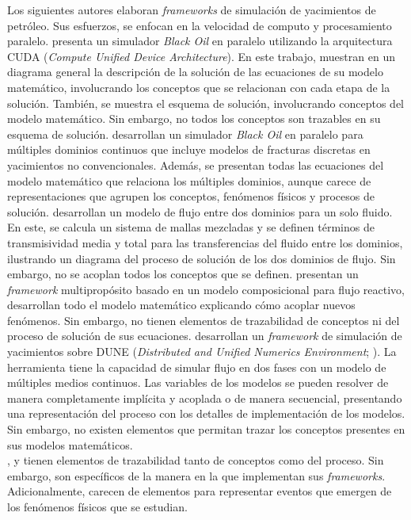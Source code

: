 Los siguientes autores elaboran \textit{frameworks} de simulación de yacimientos de petróleo. Sus esfuerzos, se enfocan en la velocidad de computo y procesamiento paralelo. \cite{Zaza2016} presenta un simulador \textit{Black Oil} en paralelo utilizando la arquitectura CUDA (\textit{Compute Unified Device Architecture}). En este trabajo, \cite{Zaza2016} muestran en un diagrama general la descripción de la solución de las ecuaciones de su modelo matemático, involucrando los conceptos que se relacionan con cada etapa de la solución. También, se muestra el esquema de solución, involucrando conceptos del modelo matemático. Sin embargo, no todos los conceptos son trazables en su esquema de solución. \cite{Wang2016, Wang2017} desarrollan un simulador \textit{Black Oil} en paralelo para múltiples dominios continuos que incluye modelos de fracturas discretas en yacimientos no convencionales. Además, se presentan todas las ecuaciones del modelo matemático que relaciona los múltiples dominios, aunque carece de representaciones que agrupen los conceptos, fenómenos físicos y procesos de solución. \cite{FANG2017} desarrollan un modelo de flujo entre dos dominios para un solo fluido. En este, se calcula un sistema de mallas mezcladas y se definen términos de transmisividad media y total para las transferencias del fluido entre los dominios, ilustrando un diagrama del proceso de solución de los dos dominios de flujo. Sin embargo, no se acoplan todos los conceptos que se definen. \cite{Qiao2017} presentan un \textit{framework} multipropósito basado en un modelo composicional para flujo reactivo, desarrollan todo el modelo matemático explicando cómo acoplar nuevos fenómenos. Sin embargo, no tienen elementos de trazabilidad de conceptos ni del proceso de solución de sus ecuaciones. \cite{Flemisch2011} desarrollan un \textit{framework} de simulación de yacimientos sobre DUNE (\textit{Distributed and Unified Numerics Environment}; \cite{DUNE24:16}). La herramienta tiene la capacidad de simular flujo en dos fases con un modelo de múltiples medios continuos. Las variables de los modelos se pueden resolver de manera completamente implícita y acoplada o de manera secuencial, presentando una representación del proceso con los detalles de implementación de los modelos. Sin embargo, no existen elementos que permitan trazar los conceptos presentes en sus modelos matemáticos. \\

\cite{Cao2002}, \cite{DeBaun2005} y \cite{ZHANG2007135} tienen elementos de trazabilidad tanto de conceptos como del proceso. Sin embargo, son específicos de la manera en la que implementan sus \textit{frameworks}. Adicionalmente, carecen de elementos para representar eventos que emergen de los fenómenos físicos que se estudian.\\

